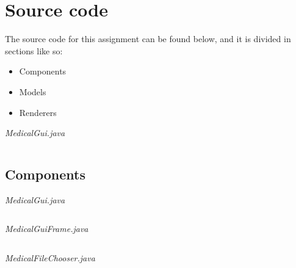 \documentclass{article}
\begin{document}
\section{Source code}%
\label{sec:source_code}
The source code for this assignment can be found below, and it is divided in sections like so:
\begin{itemize}
  \item Components
  \item Models
  \item Renderers
\end{itemize}

\textit{MedicalGui.java}
\inputminted{java}{src/main/java/com/yvesstraten/medicalconsolegui/MedicalGui.java}

\subsection{Components}%
\label{subsec:components}

\textit{MedicalGui.java}
\inputminted{java}{src/main/java/com/yvesstraten/medicalconsolegui/MedicalGui.java}

\textit{MedicalGuiFrame.java}
\inputminted{java}{src/main/java/com/yvesstraten/medicalconsolegui/components/MedicalGuiFrame.java}

\textit{MedicalFileChooser.java}
\inputminted{java}{src/main/java/com/yvesstraten/medicalconsolegui/components/MedicalFileChooser.java}
\end{document}
